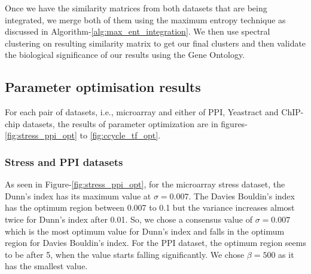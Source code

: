Once we have the similarity matrices from both datasets that are being integrated, we merge both of them using the maximum entropy technique as discussed in Algorithm-\ref{alg:max_ent_integration}. We then use spectral clustering on resulting similarity matrix to get our final clusters and then validate the biological significance of our results using the Gene Ontology.

\subsection{Parameter optimisation results}\label{param_optimisation}
For each pair of datasets, i.e., microarray and either of PPI, Yeastract and ChIP-chip datasets, the results of parameter optimization are in figures-\ref{fig:stress_ppi_opt} to \ref{fig:ccycle_tf_opt}. 
\subsubsection{Stress and PPI datasets}
As seen in Figure-\ref{fig:stress_ppi_opt}, for the microarray stress dataset, the Dunn's index has its maximum value at $\sigma=0.007$. The Davies Bouldin's index has the optimum region between 0.007 to 0.1 but the variance increases almost twice for Dunn's index after 0.01. So, we chose a consensus value of $\sigma=0.007$ which is the most optimum value for Dunn's index and falls in the optimum region for Davies Bouldin's index. For the PPI dataset, the optimum region seems to be after 5, when the value starts falling significantly. We chose $\beta=500$ as it has the smallest value.

